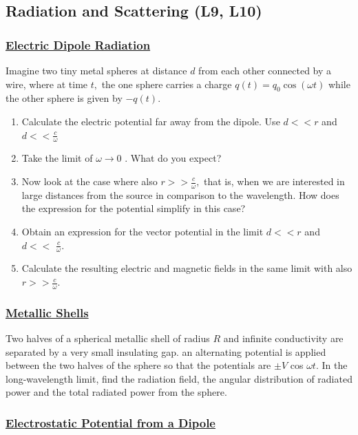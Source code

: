 \subsection{Radiation and Scattering \textbf{(L9, L10)}}

\subsubsection{\hyperref[Electric Dipole Radiation]{Electric Dipole Radiation}}

Imagine two tiny metal spheres at distance $d$ from each other connected by a wire, where at time $t,$ the one sphere carries a charge $q(t)=q_{0} \cos (\omega t)$ while the other sphere is given by $-q(t)$.

\begin{enumerate}
	\item  Calculate the electric potential far away from the dipole. Use $d<<r$ and $d<<\frac{c}{\omega}$
	\item Take the limit of $\omega \rightarrow 0$ . What do you expect?
	\item Now look at the case where also $r>>\frac{c}{\omega},$ that is, when we are interested in large distances from the source in comparison to the wavelength. How does the expression for the potential simplify in this case?
	\item Obtain an expression for the vector potential in the limit $d<<r$ and $d<<$ $\frac{c}{\omega}$.
	\item Calculate the resulting electric and magnetic fields in the same limit with also $r>>\frac{c}{\omega}$.
\end{enumerate}

\subsubsection{\hyperref[Metallic Shells]{Metallic Shells}}
Two halves of a spherical metallic shell of radius $R$ and infinite conductivity are separated by a very small insulating gap. an alternating potential is applied between the two halves of the sphere so that the potentials are $\pm V$ cos $\omega t .$ In the long-wavelength limit, find the radiation field, the angular distribution of radiated power and the total radiated power from the sphere.

\subsubsection{\hyperref[Electrostatic Potential from a Dipole]{Electrostatic Potential from a Dipole}}

